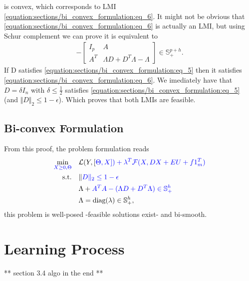 \documentclass[letterpaper,10pt,english]{sphinxmanual}
\begin{document}
is convex, which corresponds to LMI \eqref{equation:sections/bi_convex_formulation:eq_6}. It might not be obvious that \eqref{equation:sections/bi_convex_formulation:eq_6} is actually an LMI, but using
Schur complement we can prove it is equivalent to
\begin{equation*}
\begin{split}- \begin{bmatrix}
        I_p & A \\
        A^T & \Lambda D + D^T \Lambda - \Lambda
    \end{bmatrix}
    \in \mathbb{S}_+^{p + h}.\end{split}
\end{equation*}
If D satisfies \eqref{equation:sections/bi_convex_formulation:eq_5} then it satisfies \eqref{equation:sections/bi_convex_formulation:eq_6}. We imediately have that \(D = \delta I_n\) with \(\delta \leq \frac{1}{2}\) satisfies \eqref{equation:sections/bi_convex_formulation:eq_5}
(and \(\Vert D \Vert_2 \leq 1 - \epsilon\)). Which proves that both LMIs are feasible.


\section{Bi-convex Formulation}
\label{\detokenize{sections/bi_convex_formulation:bi-convex-formulation}}
From this proof, the problem formulation reads
\begin{equation}\label{equation:sections/bi_convex_formulation:eq_7}
\begin{split}\begin{align}
    \min_{\color{blue}{X} \geq 0, \color{blue}{\Theta}} \quad &\mathcal{L}(Y,[\color{blue}{\Theta},\color{blue}{X}]) + \lambda^T \mathcal{F}(\color{blue}{X},\color{blue}{DX} + \color{blue}{E}U + \color{blue}{f}1_m^T) \\
    \text{s.t.} \quad &\Vert \color{blue}{D} \Vert_2 \leq 1 - \epsilon \\
                \quad &\Lambda + \color{blue}{A}^T\color{blue}{A} - (\Lambda \color{blue}{D} + \color{blue}{D}^T \Lambda) \in \mathbb{S}_+^h \\
                \quad &\Lambda = \text{diag}(\lambda) \in \mathbb{S}_+^h,
\end{align}\end{split}
\end{equation}
this problem is well-posed -feasible solutions exist- and bi-smooth.


\chapter{Learning Process}
\label{\detokenize{sections/learning:learning-process}}\label{\detokenize{sections/learning:learning}}\label{\detokenize{sections/learning::doc}}
** section 3.4 algo in the end **
\end{document}
